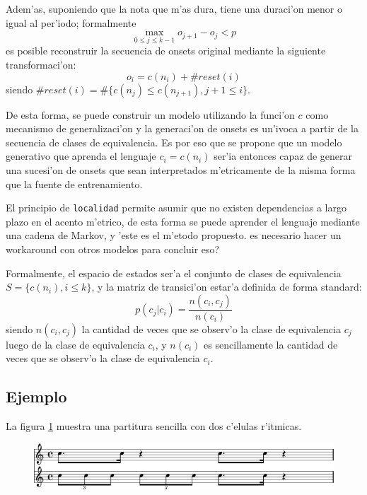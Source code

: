 Adem'as, suponiendo que la nota que m'as dura, tiene una duraci'on menor o igual al per'iodo; formalmente $$\max_{0\leq j \leq k-1}o_{j+1}-o_j < p$$ es posible reconstruir 
la secuencia de onsets original mediante la siguiente transformaci'on:
$$o_i=c(n_i) + \#reset(i)$$ siendo $\#reset(i)=\#\{c(n_j) \leq c(n_{j+1}), j+1 \leq i\}$.

De esta forma, se puede construir un modelo utilizando la funci'on $c$ como mecanismo de generalizaci'on y la generaci'on de onsets es un'ivoca a partir de la secuencia de 
clases de equivalencia. Es por eso que se propone que un modelo generativo que aprenda el lenguaje $c_i=c(n_i)$ ser'ia entonces capaz de generar una sucesi'on de onsets 
que sean interpretados m'etricamente de la misma forma que la fuente de entrenamiento. 


El principio de \texttt{localidad} permite asumir que no existen dependencias a largo plazo en el acento m'etrico, de esta forma se puede aprender el lenguaje mediante
una cadena de Markov, y 'este es el m'etodo propuesto. \alert{es necesario hacer un workaround con otros modelos para concluir eso?}

Formalmente, el espacio de estados ser'a el conjunto de clases de equivalencia $S=\{c(n_i), i\leq k \}$, y la matriz de transici'on estar'a definida de forma standard:
$$p(c_j|c_i) = \frac{n(c_i, c_j)}{n(c_i)}$$
siendo $n(c_i, c_j)$ la cantidad de veces que se observ'o la clase de equivalencia $c_j$ luego de la clase de equivalencia $c_i$, y $n(c_i)$ es sencillamente la cantidad de 
veces que se observ'o la clase de equivalencia $c_i$.

\subsection{Ejemplo}
La figura \ref{fig:reggae_rhythm} muestra una partitura sencilla con dos c'elulas r'itmicas.


\begin{figure}[h]
\begin{center}
\includegraphics[width=12cm]{images/reggae.png}
\label{fig:reggae_rhythm}
\end{center}
\end{figure}

